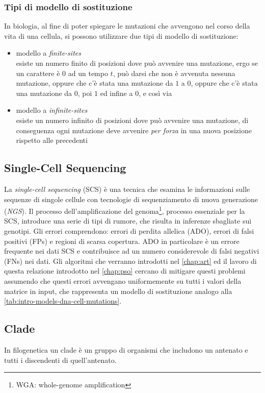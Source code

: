 \subsubsection{Tipi di modello di sostituzione}
\label{chap:intro-models-types}
In biologia, al fine di poter spiegare le mutazioni che avvengono nel corso della vita di una cellula, si possono utilizzare due tipi di modello di sostituzione:
\begin{itemize}
    \item modello a \textit{finite-sites} \\ esiste un numero finito di posizioni dove può avvenire una mutazione, ergo se un carattere è $0$ ad un tempo $t$, può darsi che non è avvenuta nessuna mutazione, oppure che c'è stata una mutazione da $1$ a $0$, oppure che c'è stata una mutazione da $0$, poi $1$ ed infine a $0$, e così via
    \item modello a \textit{infinite-sites} \\ esiste un numero infinito di posizioni dove può avvenire una mutazione, di conseguenza ogni mutazione deve avvenire \textit{per forza} in una nuova posizione rispetto alle precedenti
\end{itemize}

\subsection{Single-Cell Sequencing}
\label{chap:intro-scs}
La \textit{single-cell sequencing} (SCS) è una tecnica che esamina le informazioni sulle sequenze di singole cellule con tecnologie di sequenziamento di nuova generazione (\textit{NGS}). Il processo dell'amplificazione del genoma\footnote{WGA: whole-genome amplification}, processo essenziale per la SCS, introduce una serie di tipi di rumore, che risulta in inferenze sbagliate sui genotipi. Gli errori comprendono: errori di perdita allelica (ADO), errori di falsi positivi (FPs) e regioni di scarsa copertura. ADO in particolare è un errore frequente nei dati SCS e contribuisce ad un numero considerevole di falsi negativi (FNs) nei dati. Gli algoritmi che verranno introdotti nel \autoref{chap:art} ed il lavoro di questa relazione introdotto nel \autoref{chap:pso} cercano di mitigare questi problemi assumendo che questi errori avvengano uniformemente su tutti i valori della matrice in input, che rappresenta un modello di sostituzione analogo alla \autoref{tab:intro-models-dna-cell-mutations}.

\subsection{Clade}
\label{chap:intro-clade}
In filogenetica un clade è un gruppo di organismi che includono un antenato e tutti i discendenti di quell'antenato.

